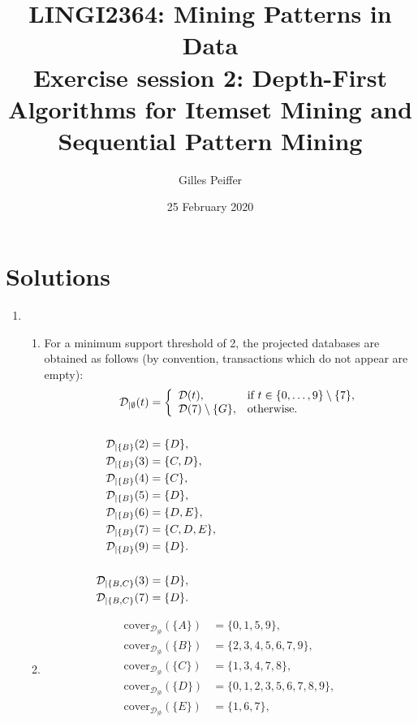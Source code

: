 \documentclass[pdf]{article}
\title{LINGI2364: Mining Patterns in Data\\\bf Exercise session 2: Depth-First Algorithms for Itemset Mining and Sequential Pattern Mining}
\date{25 February 2020}
\author{Gilles Peiffer}
\newcommand{\db}{\mathcal{D}}
\newcommand{\cover}[2]{\mathrm{cover}_{#1}({#2})}
\begin{document}
\maketitle
\setcounter{section}{1}
\section{Solutions}

\begin{enumerate}
	\item \begin{enumerate}
		\item For a minimum support threshold of 2, the projected databases are obtained as follows (by convention, transactions which do not appear are empty):
		\begin{align*}
			\db_{\vert \emptyset}(t) &= \left\{\begin{array}{l@{\quad}l}
			\db(t), & \textnormal{if } t \in \{0, \dots, 9\} \setminus \{7\}, \\
			\db(7) \setminus \{G\}, & \textnormal{otherwise}.
			\end{array} \right. \\\\
			\db_{\vert \{B\}}(2) &= \{D\}, \\
			\db_{\vert \{B\}}(3) &= \{C, D\}, \\
			\db_{\vert \{B\}}(4) &= \{C\}, \\
			\db_{\vert \{B\}}(5) &= \{D\}, \\
			\db_{\vert \{B\}}(6) &= \{D, E\}, \\
			\db_{\vert \{B\}}(7) &= \{C, D, E\}, \\
			\db_{\vert \{B\}}(9) &= \{D\}. \\\\
			\db_{\vert \{B, C\}}(3) &= \{D\}, \\
			\db_{\vert \{B, C\}}(7) &= \{D\}.
		\end{align*}
		\item \begin{align*}
			\cover{\db_{\vert \emptyset}}{\{A\}} &= \{0, 1, 5, 9\}, \\
			\cover{\db_{\vert \emptyset}}{\{B\}} &= \{2, 3, 4, 5, 6, 7, 9\}, \\
			\cover{\db_{\vert \emptyset}}{\{C\}} &= \{1, 3, 4, 7, 8\}, \\
			\cover{\db_{\vert \emptyset}}{\{D\}} &= \{0, 1, 2, 3, 5, 6, 7, 8, 9\}, \\
			\cover{\db_{\vert \emptyset}}{\{E\}} &= \{1, 6, 7\}, \\

\end{align*}
\end{enumerate}
\end{enumerate}
\end{document}
